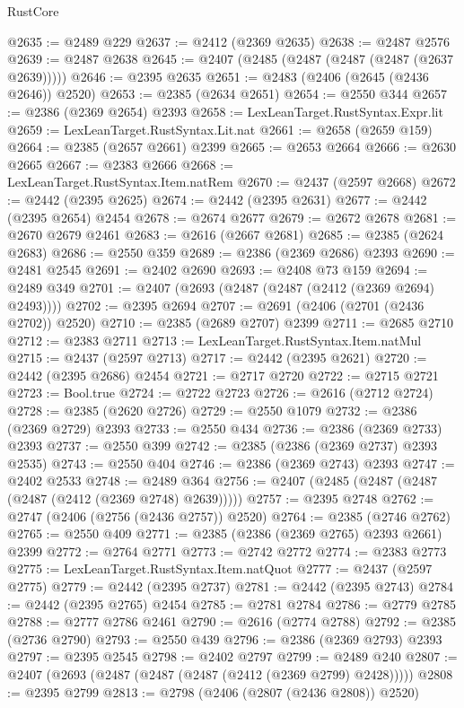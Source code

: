 \begin{lexlean}{RustCore}
\begin{coremodule}
@2635 := @2489 @229
@2637 := @2412 (@2369 @2635)
@2638 := @2487 @2576
@2639 := @2487 @2638
@2645 := @2407 (@2485 (@2487 (@2487 (@2487 (@2637 @2639)))))
@2646 := @2395 @2635
@2651 := @2483 (@2406 (@2645 (@2436 @2646)) @2520)
@2653 := @2385 (@2634 @2651)
@2654 := @2550 @344
@2657 := @2386 (@2369 @2654) @2393
@2658 := LexLeanTarget.RustSyntax.Expr.lit
@2659 := LexLeanTarget.RustSyntax.Lit.nat
@2661 := @2658 (@2659 @159)
@2664 := @2385 (@2657 @2661) @2399
@2665 := @2653 @2664
@2666 := @2630 @2665
@2667 := @2383 @2666
@2668 := LexLeanTarget.RustSyntax.Item.natRem
@2670 := @2437 (@2597 @2668)
@2672 := @2442 (@2395 @2625)
@2674 := @2442 (@2395 @2631)
@2677 := @2442 (@2395 @2654) @2454
@2678 := @2674 @2677
@2679 := @2672 @2678
@2681 := @2670 @2679 @2461
@2683 := @2616 (@2667 @2681)
@2685 := @2385 (@2624 @2683)
@2686 := @2550 @359
@2689 := @2386 (@2369 @2686) @2393
@2690 := @2481 @2545
@2691 := @2402 @2690
@2693 := @2408 @73 @159
@2694 := @2489 @349
@2701 := @2407 (@2693 (@2487 (@2487 (@2412 (@2369 @2694) @2493))))
@2702 := @2395 @2694
@2707 := @2691 (@2406 (@2701 (@2436 @2702)) @2520)
@2710 := @2385 (@2689 @2707) @2399
@2711 := @2685 @2710
@2712 := @2383 @2711
@2713 := LexLeanTarget.RustSyntax.Item.natMul
@2715 := @2437 (@2597 @2713)
@2717 := @2442 (@2395 @2621)
@2720 := @2442 (@2395 @2686) @2454
@2721 := @2717 @2720
@2722 := @2715 @2721
@2723 := Bool.true
@2724 := @2722 @2723
@2726 := @2616 (@2712 @2724)
@2728 := @2385 (@2620 @2726)
@2729 := @2550 @1079
@2732 := @2386 (@2369 @2729) @2393
@2733 := @2550 @434
@2736 := @2386 (@2369 @2733) @2393
@2737 := @2550 @399
@2742 := @2385 (@2386 (@2369 @2737) @2393 @2535)
@2743 := @2550 @404
@2746 := @2386 (@2369 @2743) @2393
@2747 := @2402 @2533
@2748 := @2489 @364
@2756 := @2407 (@2485 (@2487 (@2487 (@2487 (@2412 (@2369 @2748) @2639)))))
@2757 := @2395 @2748
@2762 := @2747 (@2406 (@2756 (@2436 @2757)) @2520)
@2764 := @2385 (@2746 @2762)
@2765 := @2550 @409
@2771 := @2385 (@2386 (@2369 @2765) @2393 @2661) @2399
@2772 := @2764 @2771
@2773 := @2742 @2772
@2774 := @2383 @2773
@2775 := LexLeanTarget.RustSyntax.Item.natQuot
@2777 := @2437 (@2597 @2775)
@2779 := @2442 (@2395 @2737)
@2781 := @2442 (@2395 @2743)
@2784 := @2442 (@2395 @2765) @2454
@2785 := @2781 @2784
@2786 := @2779 @2785
@2788 := @2777 @2786 @2461
@2790 := @2616 (@2774 @2788)
@2792 := @2385 (@2736 @2790)
@2793 := @2550 @439
@2796 := @2386 (@2369 @2793) @2393
@2797 := @2395 @2545
@2798 := @2402 @2797
@2799 := @2489 @240
@2807 := @2407 (@2693 (@2487 (@2487 (@2487 (@2412 (@2369 @2799) @2428)))))
@2808 := @2395 @2799
@2813 := @2798 (@2406 (@2807 (@2436 @2808)) @2520)

\end{coremodule}
\end{lexlean}
